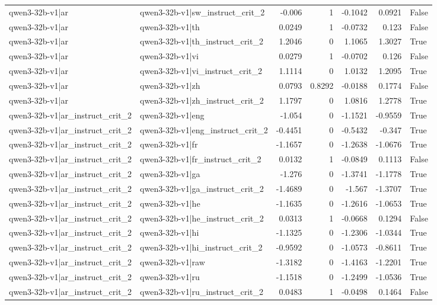 \begin{table}
\begin{tabular}{l l r r r r l}
qwen3-32b-v1|ar & qwen3-32b-v1|sw_instruct_crit_2 & -0.006 & 1 & -0.1042 & 0.0921 & False \\
qwen3-32b-v1|ar & qwen3-32b-v1|th & 0.0249 & 1 & -0.0732 & 0.123 & False \\
qwen3-32b-v1|ar & qwen3-32b-v1|th_instruct_crit_2 & 1.2046 & 0 & 1.1065 & 1.3027 & True \\
qwen3-32b-v1|ar & qwen3-32b-v1|vi & 0.0279 & 1 & -0.0702 & 0.126 & False \\
qwen3-32b-v1|ar & qwen3-32b-v1|vi_instruct_crit_2 & 1.1114 & 0 & 1.0132 & 1.2095 & True \\
qwen3-32b-v1|ar & qwen3-32b-v1|zh & 0.0793 & 0.8292 & -0.0188 & 0.1774 & False \\
qwen3-32b-v1|ar & qwen3-32b-v1|zh_instruct_crit_2 & 1.1797 & 0 & 1.0816 & 1.2778 & True \\
qwen3-32b-v1|ar_instruct_crit_2 & qwen3-32b-v1|eng & -1.054 & 0 & -1.1521 & -0.9559 & True \\
qwen3-32b-v1|ar_instruct_crit_2 & qwen3-32b-v1|eng_instruct_crit_2 & -0.4451 & 0 & -0.5432 & -0.347 & True \\
qwen3-32b-v1|ar_instruct_crit_2 & qwen3-32b-v1|fr & -1.1657 & 0 & -1.2638 & -1.0676 & True \\
qwen3-32b-v1|ar_instruct_crit_2 & qwen3-32b-v1|fr_instruct_crit_2 & 0.0132 & 1 & -0.0849 & 0.1113 & False \\
qwen3-32b-v1|ar_instruct_crit_2 & qwen3-32b-v1|ga & -1.276 & 0 & -1.3741 & -1.1778 & True \\
qwen3-32b-v1|ar_instruct_crit_2 & qwen3-32b-v1|ga_instruct_crit_2 & -1.4689 & 0 & -1.567 & -1.3707 & True \\
qwen3-32b-v1|ar_instruct_crit_2 & qwen3-32b-v1|he & -1.1635 & 0 & -1.2616 & -1.0653 & True \\
qwen3-32b-v1|ar_instruct_crit_2 & qwen3-32b-v1|he_instruct_crit_2 & 0.0313 & 1 & -0.0668 & 0.1294 & False \\
qwen3-32b-v1|ar_instruct_crit_2 & qwen3-32b-v1|hi & -1.1325 & 0 & -1.2306 & -1.0344 & True \\
qwen3-32b-v1|ar_instruct_crit_2 & qwen3-32b-v1|hi_instruct_crit_2 & -0.9592 & 0 & -1.0573 & -0.8611 & True \\
qwen3-32b-v1|ar_instruct_crit_2 & qwen3-32b-v1|raw & -1.3182 & 0 & -1.4163 & -1.2201 & True \\
qwen3-32b-v1|ar_instruct_crit_2 & qwen3-32b-v1|ru & -1.1518 & 0 & -1.2499 & -1.0536 & True \\
qwen3-32b-v1|ar_instruct_crit_2 & qwen3-32b-v1|ru_instruct_crit_2 & 0.0483 & 1 & -0.0498 & 0.1464 & False \\

\end{tabular}
\end{table}
